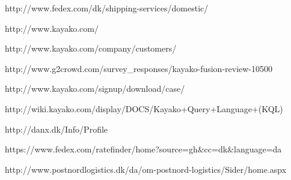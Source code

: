 \begin{thebibliography}{9}
	http://www.fedex.com/dk/shipping-services/domestic/

	http://www.kayako.com/

	http://www.kayako.com/company/customers/

	http://www.g2crowd.com/survey\_responses/kayako-fusion-review-10500

	http://www.kayako.com/signup/download/case/

	http://wiki.kayako.com/display/DOCS/Kayako+Query+Language+(KQL)

	http://danx.dk/Info/Profile

	https://www.fedex.com/ratefinder/home?source=gh\&cc=dk\&language=da

	http://www.postnordlogistics.dk/da/om-postnord-logistics/Sider/home.aspx


\end{thebibliography}
